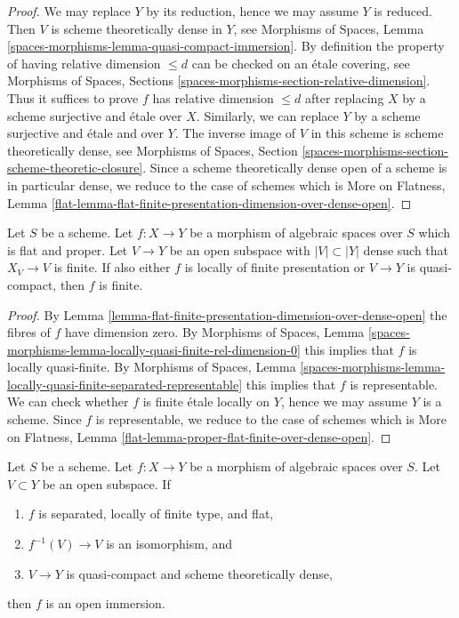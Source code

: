 \begin{proof}
We may replace $Y$ by its reduction, hence we may assume $Y$ is reduced.
Then $V$ is scheme theoretically dense in $Y$, see
Morphisms of Spaces, Lemma
\ref{spaces-morphisms-lemma-quasi-compact-immersion}.
By definition the property of having relative dimension $\leq d$ can
be checked on an \'etale covering, see
Morphisms of Spaces, Sections \ref{spaces-morphisms-section-relative-dimension}.
Thus it suffices to prove $f$ has relative dimension $\leq d$
after replacing $X$ by a scheme surjective and \'etale over $X$.
Similarly, we can replace $Y$ by a scheme surjective and
\'etale and over $Y$. The inverse image of $V$ in this scheme is scheme
theoretically dense, see
Morphisms of Spaces, Section
\ref{spaces-morphisms-section-scheme-theoretic-closure}.
Since a scheme theoretically dense open of a scheme is in particular
dense, we reduce to the case of schemes which is
More on Flatness, Lemma
\ref{flat-lemma-flat-finite-presentation-dimension-over-dense-open}.
\end{proof}

\begin{lemma}
\label{lemma-proper-flat-finite-over-dense-open}
Let $S$ be a scheme. Let $f : X \to Y$ be a morphism of algebraic spaces
over $S$ which is flat and proper. Let $V \to Y$ be an open subspace
with $|V| \subset |Y|$ dense such that $X_V \to V$ is finite. If also
either $f$ is locally of finite presentation or $V \to Y$ is quasi-compact,
then $f$ is finite.
\end{lemma}

\begin{proof}
By Lemma \ref{lemma-flat-finite-presentation-dimension-over-dense-open}
the fibres of $f$ have dimension zero.
By Morphisms of Spaces, Lemma
\ref{spaces-morphisms-lemma-locally-quasi-finite-rel-dimension-0}
this implies that $f$ is locally quasi-finite.
By Morphisms of Spaces, Lemma
\ref{spaces-morphisms-lemma-locally-quasi-finite-separated-representable}
this implies that $f$ is representable.
We can check whether $f$ is finite \'etale locally on $Y$,
hence we may assume $Y$ is a scheme. Since  $f$ is representable,
we reduce to the case of schemes which is
More on Flatness, Lemma \ref{flat-lemma-proper-flat-finite-over-dense-open}.
\end{proof}

\begin{lemma}
\label{lemma-zariski}
Let $S$ be a scheme.
Let $f : X \to Y$ be a morphism of algebraic spaces over $S$.
Let $V \subset Y$ be an open subspace. If
\begin{enumerate}
\item $f$ is separated, locally of finite type, and flat,
\item $f^{-1}(V) \to V$ is an isomorphism, and
\item $V \to Y$ is quasi-compact and scheme theoretically dense,
\end{enumerate}
then $f$ is an open immersion.
\end{lemma}

